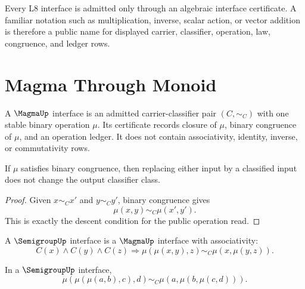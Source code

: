 \begin{principle}
\label{prin:algebra-spine-certificate-facing}
Every L8 interface is admitted only through an algebraic interface
certificate.  A familiar notation such as multiplication, inverse, scalar
action, or vector addition is therefore a public name for displayed carrier,
classifier, operation, law, congruence, and ledger rows.
\end{principle}


\section{Magma Through Monoid}
\label{sec:algebra-spine-magma-monoid}

\begin{definition}
\label{def:algebra-spine-magma}
A $\MagmaUp$ interface is an admitted carrier-classifier pair
$(C,\sim_C)$ with one stable binary operation $\mu$.  Its certificate records
closure of $\mu$, binary congruence of $\mu$, and an operation ledger.  It
does not contain associativity, identity, inverse, or commutativity rows.
\end{definition}

\begin{theorem}
\label{thm:algebra-spine-magma-descent}
If $\mu$ satisfies binary congruence, then replacing either input by a
classified input does not change the output classifier class.
\end{theorem}

\begin{proof}
Given $x\sim_C x'$ and $y\sim_C y'$, binary congruence gives
$$
\mu(x,y)\sim_C\mu(x',y').
$$
This is exactly the descent condition for the public operation read.
\end{proof}

\begin{definition}
\label{def:algebra-spine-semigroup}
A $\SemigroupUp$ interface is a $\MagmaUp$ interface with associativity:
$$
C(x)\wedge C(y)\wedge C(z)
\Longrightarrow
\mu(\mu(x,y),z)\sim_C\mu(x,\mu(y,z)).
$$
\end{definition}

\begin{theorem}
\label{thm:algebra-spine-fourfold-rebracketing}
In a $\SemigroupUp$ interface,
$$
\mu(\mu(\mu(a,b),c),d)
\sim_C
\mu(a,\mu(b,\mu(c,d))).
$$
\end{theorem}

